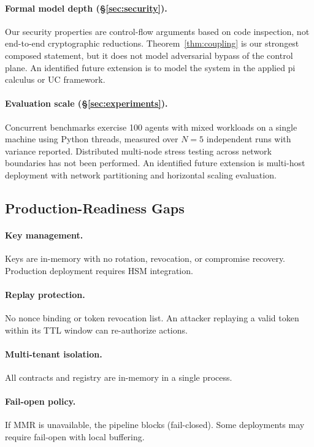 \documentclass[11pt,a4paper]{article}
\begin{document}
\paragraph{Formal model depth (\S\ref{sec:security}).}
Our security properties are control-flow arguments based on code inspection, not end-to-end
cryptographic reductions. Theorem~\ref{thm:coupling} is our strongest composed statement, but
it does not model adversarial bypass of the control plane. An identified future extension is to
model the system in the applied pi calculus or UC framework.

\paragraph{Evaluation scale (\S\ref{sec:experiments}).}
Concurrent benchmarks exercise 100 agents with mixed workloads on a single machine using Python
threads, measured over $N=5$ independent runs with variance reported. Distributed multi-node
stress testing across network boundaries has not been performed. An identified future extension
is multi-host deployment with network partitioning and horizontal scaling evaluation.

\subsection{Production-Readiness Gaps}

\paragraph{Key management.}
Keys are in-memory with no rotation, revocation, or compromise recovery. Production deployment
requires HSM integration.

\paragraph{Replay protection.}
No nonce binding or token revocation list. An attacker replaying a valid token within its TTL
window can re-authorize actions.

\paragraph{Multi-tenant isolation.}
All contracts and registry are in-memory in a single process.

\paragraph{Fail-open policy.}
If MMR is unavailable, the pipeline blocks (fail-closed). Some deployments may require
fail-open with local buffering.
\end{document}
